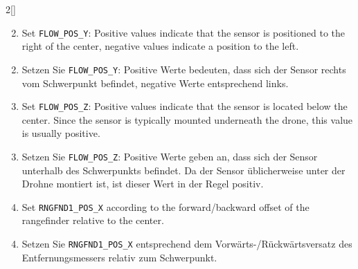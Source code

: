 \begin{paracol}{2}[]
\coleng

\begin{enumerate} 
\setcounter{enumi}{1}
\item Set \texttt{FLOW\_POS\_Y}: Positive values indicate that the sensor is positioned to the right of the center, negative values indicate a position to the left.
\end{enumerate}

\colger

\begin{enumerate}
\setcounter{enumi}{1}
\item Setzen Sie \texttt{FLOW\_POS\_Y}: Positive Werte bedeuten, dass sich der Sensor rechts vom Schwerpunkt befindet, negative Werte entsprechend links.
\end{enumerate}

\coleng

\begin{enumerate} 
\setcounter{enumi}{2}
\item Set \texttt{FLOW\_POS\_Z}: Positive values indicate that the sensor is located below the center. Since the sensor is typically mounted underneath the drone, this value is usually positive.
\end{enumerate}

\colger

\begin{enumerate}
\setcounter{enumi}{2}
\item Setzen Sie \texttt{FLOW\_POS\_Z}: Positive Werte geben an, dass sich der Sensor unterhalb des Schwerpunkts befindet. Da der Sensor üblicherweise unter der Drohne montiert ist, ist dieser Wert in der Regel positiv.
\end{enumerate}

\coleng

\begin{enumerate} 
\setcounter{enumi}{3}
\item Set \texttt{RNGFND1\_POS\_X} according to the forward/backward offset of the rangefinder relative to the center.
\end{enumerate}

\colger

\begin{enumerate}
\setcounter{enumi}{3}
\item Setzen Sie \texttt{RNGFND1\_POS\_X} entsprechend dem \mbox{Vorwärts-/}Rückwärtsversatz des Entfernungsmessers relativ zum Schwerpunkt.
\end{enumerate}

\coleng


\end{paracol}
